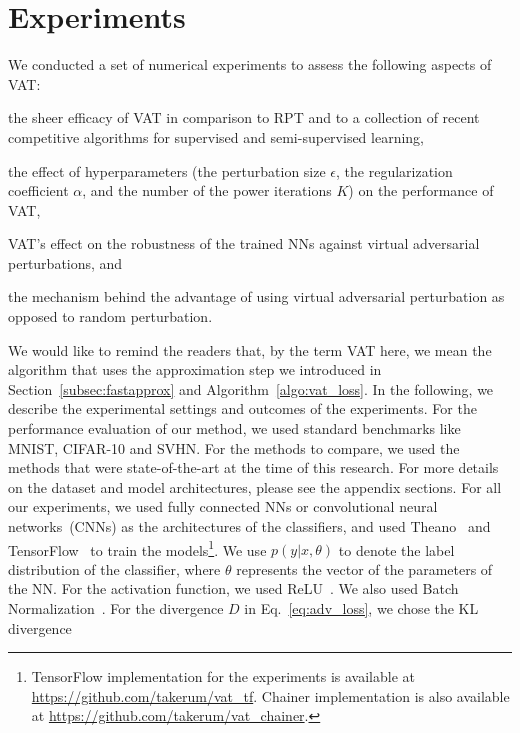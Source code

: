\documentclass[10pt,journal,compsoc]{IEEEtran}
\newcommand\iwrite[1]{\textcolor{red}{Meada: #1}}
\newenvironment{tight_itemize}{
\begin{itemize}
  \setlength{\itemsep}{0pt}
  \setlength{\parskip}{0pt}
  \setlength{\topsep}{0pt}
  \setlength{\partopsep}{0pt}
}{\end{itemize}}
\begin{document}
\section{\label{sec:experiments}Experiments}
We conducted a set of numerical experiments to assess the following aspects of VAT:  
\begin{tight_itemize}
\item the sheer efficacy of VAT in comparison to RPT and to a collection of recent competitive algorithms for supervised and semi-supervised learning,
\item the effect of hyperparameters (the perturbation size $\epsilon$, the regularization coefficient $\alpha$, and the number of the power iterations $K$) on the performance of VAT, 
\item VAT's effect on the robustness of the trained NNs against virtual adversarial perturbations, and
\item the mechanism behind the advantage of using virtual adversarial perturbation as opposed to random perturbation.
\end{tight_itemize} 
We would like to remind the readers that, by the term VAT here, we mean the algorithm that uses the approximation step we introduced in Section~\ref{subsec:fastapprox} and Algorithm~\ref{algo:vat_loss}. In the following, we describe the experimental settings and outcomes of the experiments. 
For the performance evaluation of our method, we used standard benchmarks like MNIST, CIFAR-10 and SVHN.  
For the methods to compare, we used the methods that were state-of-the-art at the time of this research.
For more details on the dataset and model architectures, please see the appendix sections.
For all our experiments, we used fully connected NNs or convolutional neural networks~(CNNs) as the architectures of the classifiers, and 
used Theano~\cite{2016arXiv160502688short} and TensorFlow~\cite{abadi2016tensorflow} to train the models\footnote{TensorFlow implementation for the experiments is available at \url{https://github.com/takerum/vat_tf}. 
Chainer\cite{tokui2015chainer} implementation is also available at \url{https://github.com/takerum/vat_chainer}.}.
We use $p(y|x,\theta)$ to denote the label distribution of the classifier, where $\theta$ represents the vector of the parameters of the NN.
For the activation function, we used ReLU~\cite{jarrett2009best, nair2010rectified, glorot2011deep}.  
We also used Batch Normalization~\cite{ioffe2015batch}. 
For the divergence $D$ in Eq.~\eqref{eq:adv_loss}, we chose the KL divergence 
\end{document}
